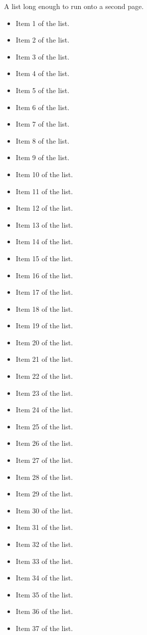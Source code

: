 \documentclass{article}
\begin{document}
A list long enough to run onto a second page.
\begin{itemize}
  \item Item 1 of the list.
  \item Item 2 of the list.
  \item Item 3 of the list.
  \item Item 4 of the list.
  \item Item 5 of the list.
  \item Item 6 of the list.
  \item Item 7 of the list.
  \item Item 8 of the list.
  \item Item 9 of the list.
  \item Item 10 of the list.
  \item Item 11 of the list.
  \item Item 12 of the list.
  \item Item 13 of the list.
  \item Item 14 of the list.
  \item Item 15 of the list.
  \item Item 16 of the list.
  \item Item 17 of the list.
  \item Item 18 of the list.
  \item Item 19 of the list.
  \item Item 20 of the list.
  \item Item 21 of the list.
  \item Item 22 of the list.
  \item Item 23 of the list.
  \item Item 24 of the list.
  \item Item 25 of the list.
  \item Item 26 of the list.
  \item Item 27 of the list.
  \item Item 28 of the list.
  \item Item 29 of the list.
  \item Item 30 of the list.
  \item Item 31 of the list.
  \item Item 32 of the list.
  \item Item 33 of the list.
  \item Item 34 of the list.
  \item Item 35 of the list.
  \item Item 36 of the list.
  \item Item 37 of the list.

\end{itemize}
\end{document}
